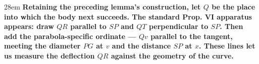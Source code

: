 \documentclass[border=4pt]{standalone}
\begin{document}
\begin{varwidth}{28em}
\large\bfseries
Retaining the preceding lemma's construction, let $Q$ be the place into which the body      next succeeds. The \textcolor{constpurple}{standard Prop. VI apparatus} appears: draw $QR$ parallel      to $SP$ and $QT$ perpendicular to $SP$. Then add the parabola-specific ordinate —      \textcolor{constpurple}{$Qv$ parallel to the tangent}, meeting the diameter $PG$ at $v$ and the      distance $SP$ at $x$. These lines let us measure the deflection $QR$ against the geometry      of the curve.
\end{varwidth}
\end{document}
